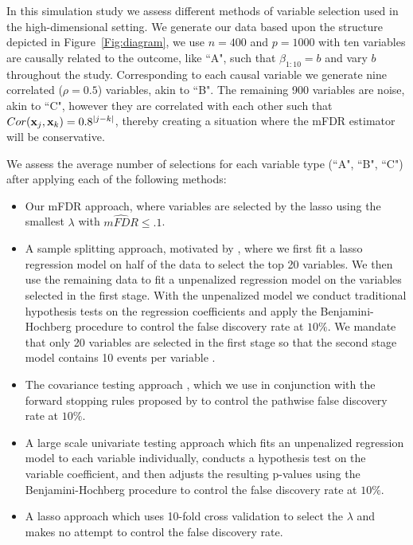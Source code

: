 In this simulation study we assess different methods of variable selection used in the high-dimensional setting. We generate our data based upon the structure depicted in Figure~\ref{Fig:diagram}, we use $n = 400$ and $p = 1000$ with ten variables are causally related to the outcome, like ``A", such that $\beta_{1:10} = b$ and vary $b$ throughout the study. Corresponding to each causal variable we generate nine correlated ($\rho = 0.5$) variables, akin to ``B". The remaining 900 variables are noise, akin to ``C", however they are correlated with each other such that $Cor(\mathbf{x}_j,\mathbf{x}_k) = 0.8^{|j - k|}$, thereby creating a situation where the mFDR estimator will be conservative.

We assess the average number of selections for each variable type (``A", ``B", ``C") after applying each of the following methods:
\begin{itemize}
\item Our mFDR approach, where variables are selected by the lasso using the smallest $\lambda$ with $\widehat{mFDR} \leq .1$.  
\item A sample splitting approach, motivated by \citet{Sample_Splitting}, where we first fit a lasso regression model on half of the data to select the top 20 variables. We then use the remaining data to fit a unpenalized regression model on the variables selected in the first stage. With the unpenalized model we conduct traditional hypothesis tests on the regression coefficients and apply the Benjamini-Hochberg procedure \citep{BH_1995} to control the false discovery rate at $10\%$. We mandate that only 20 variables are selected in the first stage so that the second stage model contains 10 events per variable \citep{peduzzi_epv}.
\item The covariance testing approach \citep{CovTest}, which we use in conjunction with the forward stopping rules proposed by \citet{GSell2016} to control the pathwise false discovery rate at $10\%$. 
\item A large scale univariate testing approach which fits an unpenalized regression model to each variable individually, conducts a hypothesis test on the variable coefficient, and then adjusts the resulting p-values using the Benjamini-Hochberg procedure to control the false discovery rate at $10\%$.
\item A lasso approach which uses 10-fold cross validation to select the $\lambda$ and makes no attempt to control the false discovery rate.
\end{itemize}

